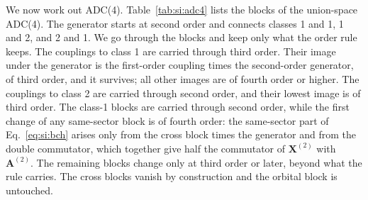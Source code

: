 \documentclass[aip,jcp,reprint,noshowkeys,superscriptaddress]{revtex4-2}
\theoremstyle{plain}
\theoremstyle{definition}
\theoremstyle{remark}
\begin{document}
We now work out ADC(4). Table~\ref{tab:si:adc4} lists the blocks of the
union-space ADC(4). The generator starts at second order and connects classes
1 and 1, 1 and 2, and 2 and 1. We go through the blocks and keep only what the
order rule keeps. The couplings to class 1 are carried through third order.
Their image under the generator is the first-order coupling times the
second-order generator, of third order, and it survives; all other images are
of fourth order or higher. The couplings to class 2 are carried through second
order, and their lowest image is of third order. The class-1 blocks are
carried through second order, while the first change of any same-sector block is
of fourth order: the same-sector part of Eq.~\eqref{eq:si:bch} arises only from
the cross block times the generator and from the double commutator, which
together give half the commutator of $\mathbf{X}^{(2)}$ with
$\mathbf{A}^{(2)}$. The remaining blocks change only at third order or later,
beyond what the rule carries. The cross blocks vanish by construction and the
orbital block is untouched.
\end{document}
